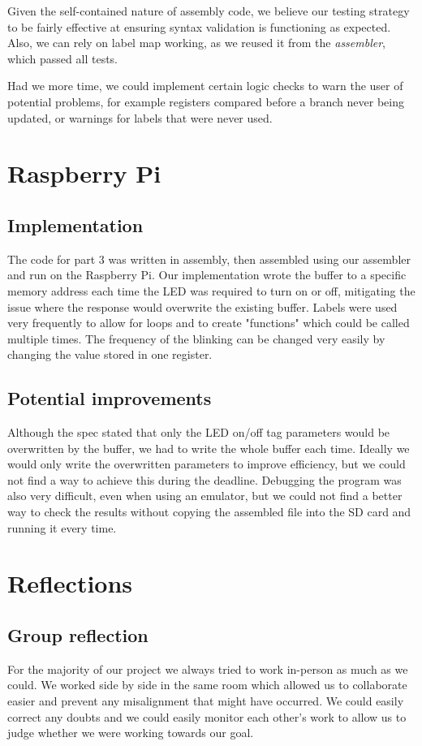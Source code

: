 \documentclass[11pt]{article}
\begin{document}
Given the self-contained nature of assembly code, we believe our testing strategy to be fairly effective at ensuring syntax validation is functioning as expected. Also, we can rely on label map working, as we reused it from the {\it assembler}, which passed all tests.

Had we more time, we could implement certain logic checks to warn the user of potential problems, for example registers compared before a branch never being updated, or warnings for labels that were never used.

\section{Raspberry Pi}
\subsection{Implementation}
The code for part 3 was written in assembly, then assembled using our assembler and run on the Raspberry Pi. Our implementation wrote the buffer to a specific memory address each time the LED was required to turn on or off, mitigating the issue where the response would overwrite the existing buffer. Labels were used very frequently to allow for loops and to create "functions" which could be called multiple times. The frequency of the blinking can be changed very easily by changing the value stored in one register.
\subsection{Potential improvements}
Although the spec stated that only the LED on/off tag parameters would be overwritten by the buffer, we had to write the whole buffer each time. Ideally we would only write the overwritten parameters to improve efficiency, but we could not find a way to achieve this during the deadline. Debugging the program was also very difficult, even when using an emulator, but we could not find a better way to check the results without copying the assembled file into the SD card and running it every time. 


\pagebreak
\section{Reflections}
\subsection{Group reflection}
For the majority of our project we always tried to work in-person as much as we could. We worked side by side in the same room which allowed us to collaborate easier and prevent any misalignment that might have occurred. We could easily correct any doubts and we could easily monitor each other's work to allow us to judge whether we were working towards our goal. 
\end{document}
